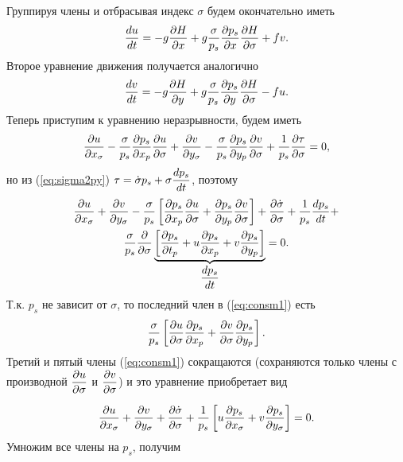 Группируя члены и отбрасывая индекс $\sigma$ будем окончательно иметь
\begin{equation}
    \label{eq:dudt_sigma}
    \td{u}{t} = -g\pd{H}{x}+g\frac{\sigma}{p_s}\pd{p_s}{x}\pd{H}{\sigma}+fv.
\end{equation}
Второе уравнение движения получается аналогично
\begin{equation}
    \label{eq:dvdt_sigma}
    \td{v}{t} = -g\pd{H}{y}+g\frac{\sigma}{p_s}\pd{p_s}{y}\pd{H}{\sigma}-fu.
\end{equation}
Теперь приступим к уравнению неразрывности, будем иметь
\begin{equation*}
    \displaystyle\frac{\partial u}{\partial x_{\sigma}}-\frac{\sigma}{p_s}\displaystyle\frac{\partial p_s}{\partial x_p}\displaystyle\frac{\partial u}{\partial \sigma}+\displaystyle\frac{\partial v}{\partial y_{\sigma}}-\frac{\sigma}{p_s}\displaystyle\frac{\partial p_s}{\partial y_p}\displaystyle\frac{\partial v}{\partial \sigma}+\frac{1}{p_s}\displaystyle\frac{\partial \tau}{\partial \sigma}=0,
\end{equation*}
но из (\ref{eq:sigma2py}) $\tau=\dot{\sigma}p_s+\sigma\displaystyle\frac{d p_s}{d t}$, поэтому
\begin{multline}
    \label{eq:consm1}
    \pd{u}{x_{\sigma}}+\pd{v}{y_{\sigma}}-
    \frac{\sigma}{p_s} \left[ \pd{p_s}{x_p} \pd{u}{\sigma}+\pd{p_s}{y_p}\pd{v}{\sigma}  \right] + \pd{\dot{\sigma}}{\sigma}+\frac{1}{p_s}\td{p_s}{t}+\\
    \frac{\sigma}{p_s}\pd{}{\sigma} \underbrace{\left[ \pd{p_s}{t_p} + u\pd{p_s}{x_p}+v\pd{p_s}{y_p} \right]}_{\td{p_s}{t}} = 0.
\end{multline}
Т.к. $p_s$ не зависит от $\sigma$, то последний член в (\ref{eq:consm1}) есть 
\begin{equation*}
    \frac{\sigma}{p_s} \left[ \displaystyle\frac{\partial u}{\partial \sigma}\displaystyle\frac{\partial p_s}{\partial x_p} + \displaystyle\frac{\partial v}{\partial \sigma}\displaystyle\frac{\partial p_s}{\partial y_p}  \right].
\end{equation*}
Третий и пятый члены (\ref{eq:consm1}) сокращаются (сохраняются только члены с производной $\displaystyle\frac{\partial u}{\partial \sigma}$ и $ \displaystyle\frac{\partial v}{\partial \sigma}$) и это уравнение приобретает вид

\begin{equation*}
    \displaystyle\frac{\partial u}{\partial x_{\sigma}} + \displaystyle\frac{\partial v}{\partial y_{\sigma}} + \displaystyle\frac{\partial  \dot{\sigma} }{\partial \sigma} + \frac{1}{p_s} \left[ u\displaystyle\frac{\partial p_s}{\partial x_{\sigma}} + v\displaystyle\frac{\partial p_s}{\partial y_{\sigma}} \right] = 0.
\end{equation*}
Умножим все члены на $p_s$, получим

